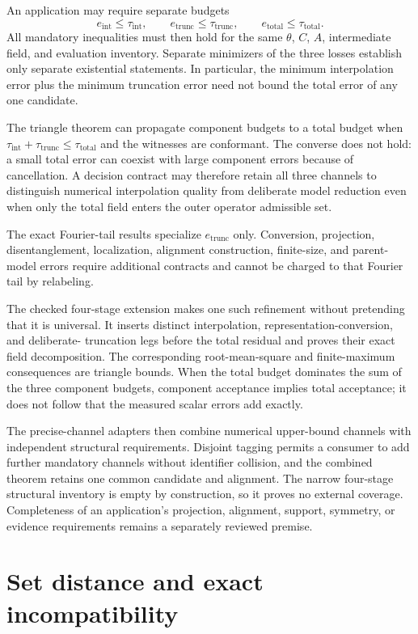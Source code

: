 An application may require separate budgets
\[
  e_{\mathrm{int}}\leq\tau_{\mathrm{int}},\qquad
  e_{\mathrm{trunc}}\leq\tau_{\mathrm{trunc}},\qquad
  e_{\mathrm{total}}\leq\tau_{\mathrm{total}}.
\]
All mandatory inequalities must then hold for the same $\theta$, $C$, $A$, intermediate
field, and evaluation inventory.  Separate minimizers of the three losses establish
only separate existential statements.  In particular, the minimum interpolation error
plus the minimum truncation error need not bound the total error of any one candidate.

The triangle theorem can propagate component budgets to a total budget when
$\tau_{\mathrm{int}}+\tau_{\mathrm{trunc}}\leq\tau_{\mathrm{total}}$ and the witnesses
are conformant.  The converse does not hold: a small total error can coexist with large
component errors because of cancellation.  A decision contract may therefore retain
all three channels to distinguish numerical interpolation quality from deliberate
model reduction even when only the total field enters the outer operator admissible
set.

The exact Fourier-tail results specialize $e_{\mathrm{trunc}}$ only.  Conversion,
projection, disentanglement, localization, alignment construction, finite-size, and
parent-model errors require additional contracts and cannot be charged to that Fourier
tail by relabeling.

The checked four-stage extension makes one such refinement without pretending that it is
universal.  It inserts distinct interpolation, representation-conversion, and deliberate-
truncation legs before the total residual and proves their exact field decomposition.  The
corresponding root-mean-square and finite-maximum consequences are triangle bounds.  When the total
budget dominates the sum of the three component budgets, component acceptance implies total
acceptance; it does not follow that the measured scalar errors add exactly.

The precise-channel adapters then combine numerical upper-bound channels with independent
structural requirements.  Disjoint tagging permits a consumer to add further mandatory channels
without identifier collision, and the combined theorem retains one common candidate and alignment.
The narrow four-stage structural inventory is empty by construction, so it proves no external
coverage.  Completeness of an application's projection, alignment, support, symmetry, or evidence
requirements remains a separately reviewed premise.

\section{Set distance and exact incompatibility}


